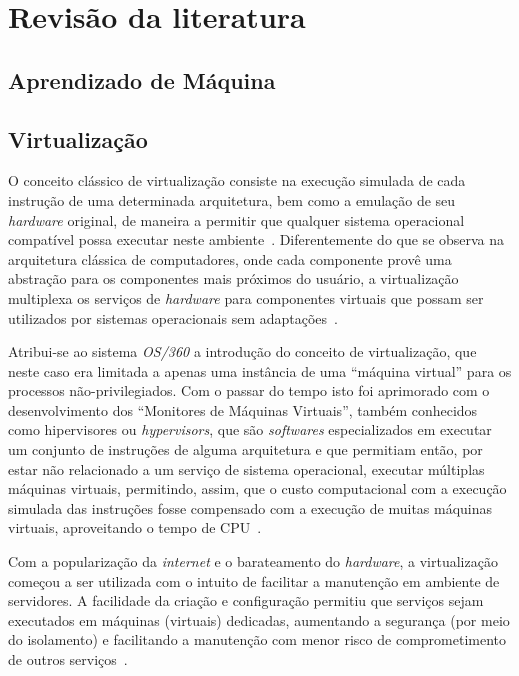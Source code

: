 %
%

\chapter{Revisão da literatura}

\section{Aprendizado de Máquina}\label{sec:aprendizado}



\section{Virtualização}\label{sec:virt}

O conceito clássico de virtualização consiste na execução simulada de cada
instrução de uma determinada arquitetura, bem como a emulação de seu
\emph{hardware} original, de maneira a permitir que qualquer sistema operacional
compatível possa executar neste ambiente~\cite{goldberg1974survey}.
Diferentemente do que se observa na arquitetura clássica de computadores,
onde cada componente provê uma abstração para os componentes mais próximos do
usuário, a virtualização multiplexa os serviços de \emph{hardware} para
componentes virtuais que possam ser utilizados por sistemas operacionais
sem adaptações~\cite{dutra2009a}.


Atribui-se ao sistema \emph{OS/360} a introdução do conceito de
virtualização, que neste caso era limitada a apenas uma instância de uma
``máquina virtual'' para os processos não-privilegiados. Com o passar do
tempo isto foi aprimorado com o desenvolvimento dos ``Monitores de
Máquinas Virtuais'', também conhecidos como hipervisores ou
\emph{hypervisors}, que são \emph{softwares} especializados em executar um
conjunto de instruções de alguma arquitetura e que permitiam então, por
estar não relacionado a um serviço de sistema operacional, executar
múltiplas máquinas virtuais, permitindo, assim, que o custo computacional com
a execução simulada das instruções fosse compensado com a execução de
muitas máquinas virtuais, aproveitando o tempo de
CPU~\cite{goldberg1974survey}.

Com a popularização da \emph{internet} e o barateamento do \emph{hardware}, a
virtualização começou a ser utilizada com o intuito de facilitar a
manutenção em ambiente de servidores. A facilidade da criação e
configuração permitiu que serviços sejam executados em máquinas (virtuais)
dedicadas, aumentando a segurança (por meio do isolamento) e facilitando a
manutenção com menor risco de comprometimento de outros
serviços~\cite{smith2005architecture}.

